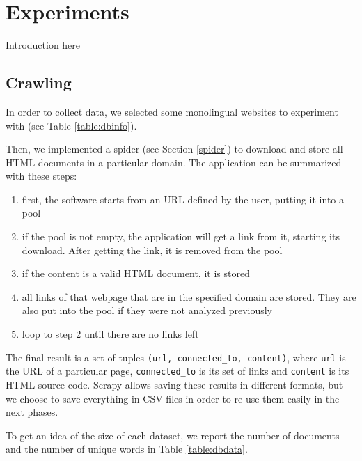 \chapter{Experiments}
Introduction here

\section{Crawling}
In order to collect data, we selected some monolingual websites to experiment with (see Table \ref{table:dbinfo}).

Then, we implemented a spider (see Section \ref{spider}) to download and store all HTML documents in a particular domain.
The application can be summarized with these steps:
\begin{enumerate}
    \item first, the software starts from an URL defined by the user, putting it into a pool
    \item if the pool is not empty, the application will get a link from it, starting its download. After getting the link, it is removed from the pool
    \item if the content is a valid HTML document, it is stored
    \item all links of that webpage that are in the specified domain are stored. They are also put into the pool if they were not analyzed previously
    \item loop to step 2 until there are no links left
\end{enumerate}
The final result is a set of tuples \texttt{(url, connected\_to, content)}, where \texttt{url} is the URL of a particular page, \texttt{connected\_to} is its set of links and \texttt{content} is its HTML source code.
Scrapy allows saving these results in different formats, but we choose to save everything in CSV files in order to re-use them easily in the next phases.

To get an idea of the size of each dataset, we report the number of documents and the number of unique words in Table \ref{table:dbdata}.

